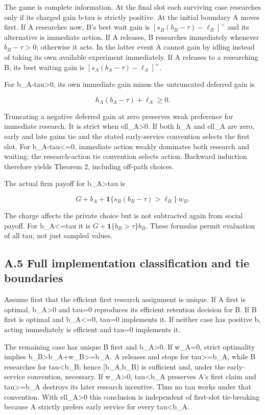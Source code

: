 \documentclass[
  11pt,
]{article}
\begin{document}
The game is complete information. At the final slot each surviving case
researches only if its charged gain b-tau is strictly positive. At the
initial boundary A moves first. If A researches now, B's best wait gain
is \([s_B(b_B-\tau)-\ell_B]^+\) and its alternative is immediate action.
If A releases, B researches immediately whenever \(b_B-\tau>0\);
otherwise it acts. In the latter event A cannot gain by idling instead
of taking its own available experiment immediately. If A releases to a
researching B, its best waiting gain is \([s_A(b_A-\tau)-\ell_A]^+\).

For b\_A-tau\textgreater0, its own immediate gain minus the untruncated
deferred gain is

\[h_A(b_A-\tau)+\ell_A\geq0.\]

Truncating a negative deferred gain at zero preserves weak preference
for immediate research. It is strict when ell\_A\textgreater0. If both
h\_A and ell\_A are zero, early and late gains tie and the stated
early-service convention selects the first slot. For
b\_A-tau\textless=0, immediate action weakly dominates both research and
waiting; the research-action tie convention selects action. Backward
induction therefore yields Theorem 2, including off-path choices.

The actual firm payoff for b\_A\textgreater tau is

\[G+b_A+\mathbf 1\{s_B(b_B-\tau)>\ell_B\}\,w_B.\]

The charge affects the private choice but is not subtracted again from
social payoff. For b\_A\textless=tau it is
\(G+\mathbf 1\{b_B>\tau\}b_B\). These formulas permit evaluation of all
tau, not just sampled values.

\subsection{A.5 Full implementation classification and tie
boundaries}\label{a.5-full-implementation-classification-and-tie-boundaries}

Assume first that the efficient first research assignment is unique. If
A first is optimal, b\_A\textgreater0 and tau=0 reproduces its efficient
retention decision for B. If B first is optimal and b\_A\textless=0,
tau=0 implements it. If neither case has positive b, acting immediately
is efficient and tau=0 implements it.

The remaining case has unique B first and b\_A\textgreater0. If w\_A=0,
strict optimality implies b\_B\textgreater b\_A+w\_B\textgreater=b\_A. A
releases and stops for tau\textgreater=b\_A, while B researches for
tau\textless b\_B; hence {[}b\_A,b\_B) is sufficient and, under the
early-service convention, necessary. If w\_A\textgreater0,
tau\textless b\_A preserves A's first claim and tau\textgreater=b\_A
destroys its later research incentive. Thus no tau works under that
convention. With ell\_A\textgreater0 this conclusion is independent of
first-slot tie-breaking because A strictly prefers early service for
every tau\textless b\_A.
\end{document}
